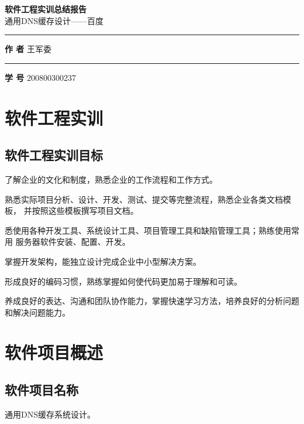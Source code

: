 \documentclass[12pt, a4paper, titlepage]{article}
\begin{document}
\begin{titlepage}
\centering
\Huge\textbf{软件工程实训总结报告}\\[7pt]
\large{通用DNS缓存设计——百度}\\[50mm]

\rule{35mm}{0pt}
\textbf{作 \qquad 者} { \hfill 王军委  \quad\quad \quad \quad \quad \quad} \\
\rule{35mm}{0pt}
\textbf{学 \qquad 号} { \hfill   200800300237 \quad\quad \quad \quad \quad}

\end{titlepage}

\newpage
{}%
\tableofcontents

\newpage
{}
\section{软件工程实训}
\subsection{软件工程实训目标}
\begin{asparaenum}
\item{了解企业的文化和制度，熟悉企业的工作流程和工作方式。}
\item{熟悉实际项目分析、设计、开发、测试、提交等完整流程，熟悉企业各类文档模板，
并按照这些模板撰写项目文档。}
\item{悉使用各种开发工具、系统设计工具、项目管理工具和缺陷管理工具；熟练使用常用
服务器软件安装、配置、开发。}
\item{掌握开发架构，能独立设计完成企业中小型解决方案。}
\item{形成良好的编码习惯，熟练掌握如何使代码更加易于理解和可读。}
\item{养成良好的表达、沟通和团队协作能力，掌握快速学习方法，培养良好的分析问题
和解决问题能力。}
\end{asparaenum}

\section{软件项目概述}
\subsection{软件项目名称}
通用DNS缓存系统设计。
\end{document}
